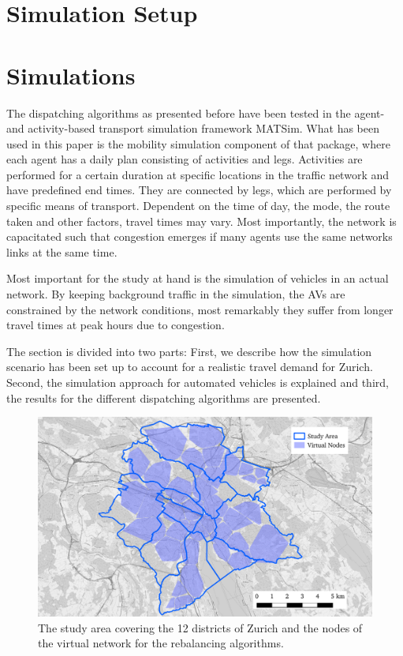 \section{Simulation Setup}

\section{Simulations}

The dispatching algorithms as presented before have been tested in the agent-
and activity-based transport simulation framework MATSim. What has been used in
this paper is the mobility simulation component of that package, where each agent
has a daily plan consisting of activities and legs. Activities are performed for a
certain duration at specific locations in the traffic network and have predefined
end times. They are connected by legs, which are performed by specific means of
transport. Dependent on the time of day, the mode, the route taken and other factors,
travel times may vary. Most importantly, the network is capacitated such that
congestion emerges if many agents use the same networks links at the same time.

Most important for the study at hand is the simulation of vehicles in an actual
network. By keeping background traffic in the simulation, the AVs are constrained
by the network conditions, most remarkably they suffer from longer travel times
at peak hours due to congestion.

The section is divided into two parts: First, we describe how the simulation
scenario has been set up to account for a realistic travel demand for Zurich.
Second, the simulation approach for automated vehicles is explained and third,
the results for the different dispatching algorithms are presented.

\begin{figure}[h]
\begin{center}\includegraphics[width=1.0\textwidth]{figures/map.pdf}\end{center}
\caption{The study area covering the 12 districts of Zurich and the nodes of the virtual network for the rebalancing algorithms.}
\label{fig:study_area_vnodes}
\end{figure}
